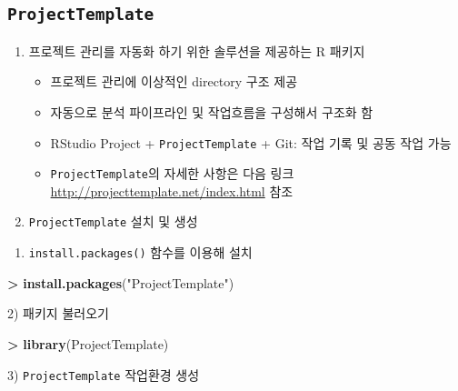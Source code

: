 \documentclass[11pt,a4paper]{book}
\newenvironment{Shaded}{\begin{snugshade}}{\end{snugshade}}
\newcommand{\KeywordTok}[1]{\textcolor[rgb]{0.13,0.29,0.53}{\textbf{#1}}}
\newcommand{\StringTok}[1]{\textcolor[rgb]{0.31,0.60,0.02}{#1}}
\newcommand{\OperatorTok}[1]{\textcolor[rgb]{0.81,0.36,0.00}{\textbf{#1}}}
\newcommand{\NormalTok}[1]{#1}
\providecommand{\tightlist}{%
  \setlength{\itemsep}{0pt}\setlength{\parskip}{0pt}}
\theoremstyle{definition}
\theoremstyle{definition}
\theoremstyle{definition}
\theoremstyle{remark}
\begin{document}
\subsection{\texorpdfstring{\texttt{ProjectTemplate}}{ProjectTemplate}}\label{projecttemplate}

\begin{enumerate}
\def\labelenumi{\arabic{enumi}.}
\tightlist
\item
  프로젝트 관리를 자동화 하기 위한 솔루션을 제공하는 R 패키지

  \begin{itemize}
  \tightlist
  \item
    프로젝트 관리에 이상적인 directory 구조 제공
  \item
    자동으로 분석 파이프라인 및 작업흐름을 구성해서 구조화 함
  \item
    RStudio Project + \texttt{ProjectTemplate} + Git: 작업 기록 및 공동
    작업 가능
  \item
    \texttt{ProjectTemplate}의 자세한 사항은 다음 링크
    \url{http://projecttemplate.net/index.html} 참조
  \end{itemize}
\item
  \texttt{ProjectTemplate} 설치 및 생성
\end{enumerate}

\begin{enumerate}
\def\labelenumi{\arabic{enumi})}
\tightlist
\item
  \texttt{install.packages()} 함수를 이용해 설치
\end{enumerate}

\footnotesize

\begin{Shaded}
\begin{Highlighting}[]
\OperatorTok{>}\StringTok{ }\KeywordTok{install.packages}\NormalTok{(}\StringTok{"ProjectTemplate"}\NormalTok{)}
\end{Highlighting}
\end{Shaded}

\normalsize
 2) 패키지 불러오기

\footnotesize

\begin{Shaded}
\begin{Highlighting}[]
\OperatorTok{>}\StringTok{ }\KeywordTok{library}\NormalTok{(ProjectTemplate)}
\end{Highlighting}
\end{Shaded}

\normalsize
 3) \texttt{ProjectTemplate} 작업환경 생성 \footnotesize
\end{document}
